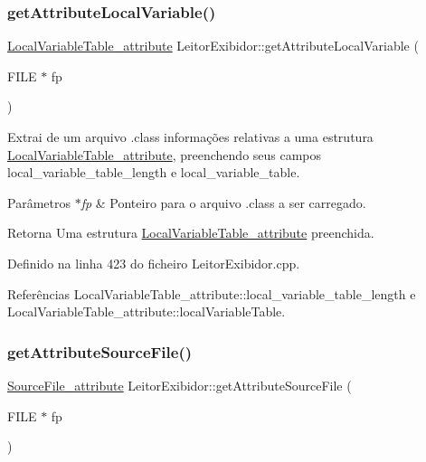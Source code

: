\subsubsection{\texorpdfstring{get\+Attribute\+Local\+Variable()}{getAttributeLocalVariable()}}
{\footnotesize\ttfamily \hyperlink{structLocalVariableTable__attribute}{Local\+Variable\+Table\+\_\+attribute} Leitor\+Exibidor\+::get\+Attribute\+Local\+Variable (\begin{DoxyParamCaption}\item[{F\+I\+LE $\ast$}]{fp }\end{DoxyParamCaption})\hspace{0.3cm}{\ttfamily [private]}}

Extrai de um arquivo .class informações relativas a uma estrutura \hyperlink{structLocalVariableTable__attribute}{Local\+Variable\+Table\+\_\+attribute}, preenchendo seus campos local\+\_\+variable\+\_\+table\+\_\+length e local\+\_\+variable\+\_\+table. 
\begin{DoxyParams}{Parâmetros}
{\em $\ast$fp} & Ponteiro para o arquivo .class a ser carregado. \\
\hline
\end{DoxyParams}
\begin{DoxyReturn}{Retorna}
Uma estrutura \hyperlink{structLocalVariableTable__attribute}{Local\+Variable\+Table\+\_\+attribute} preenchida. 
\end{DoxyReturn}


Definido na linha 423 do ficheiro Leitor\+Exibidor.\+cpp.



Referências Local\+Variable\+Table\+\_\+attribute\+::local\+\_\+variable\+\_\+table\+\_\+length e Local\+Variable\+Table\+\_\+attribute\+::local\+Variable\+Table.

\mbox{\label{classLeitorExibidor_a265f56dc5c7eb8cfc9471435735c2145}} 
\subsubsection{\texorpdfstring{get\+Attribute\+Source\+File()}{getAttributeSourceFile()}}
{\footnotesize\ttfamily \hyperlink{structSourceFile__attribute}{Source\+File\+\_\+attribute} Leitor\+Exibidor\+::get\+Attribute\+Source\+File (\begin{DoxyParamCaption}\item[{F\+I\+LE $\ast$}]{fp }\end{DoxyParamCaption})\hspace{0.3cm}{\ttfamily [private]}}

